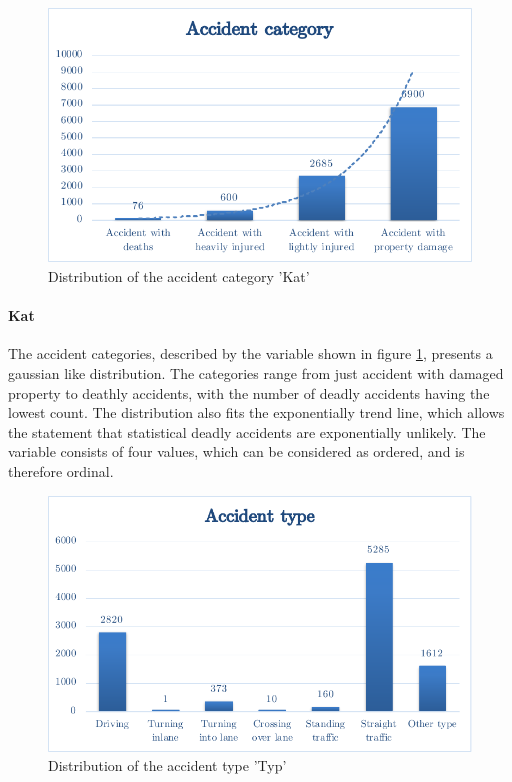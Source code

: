 \documentclass[a4paper,12pt]{report}
\begin{document}
\begin{figure}[h]
	\centering
	\includegraphics[scale=0.6]{./assets/baysis_dataset_Kat.pdf}
	\caption{Distribution of the accident category 'Kat'}
	\label{img:baysis_dataset_Kat}
\end{figure}

\paragraph{Kat}
The accident categories, described by the variable shown in figure \ref{img:baysis_dataset_Kat}, presents a gaussian like distribution. The categories range from just accident with damaged property to deathly accidents, with the number of deadly accidents having the lowest count. The distribution also fits the exponentially trend line, which allows the statement that statistical deadly accidents are exponentially unlikely. The variable consists of four values, which can be considered as ordered, and is therefore ordinal.

\begin{figure}[h]
	\centering
	\includegraphics[scale=0.6]{./assets/baysis_dataset_Typ.pdf}
	\caption{Distribution of the accident type 'Typ'}
	\label{img:baysis_dataset_Typ}
\end{figure}
\end{document}
